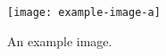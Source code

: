 \documentclass[a4paper,12pt]{report}
\begin{document}
\renewcommand{\thefigure}{S\arabic{figure}}
\begin{figure}
    \centering
    \texttt{[image: example-image-a]}
    \caption{An example image.}
    \label{fig:example}
\end{figure}
\end{document}
